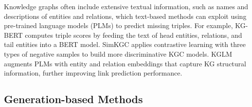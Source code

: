 \documentclass[11pt]{article}
\begin{document}
Knowledge graphs often include extensive textual information, such as names and descriptions of entities and relations, which text-based methods can exploit using pre-trained language models (PLMs) to predict missing triples. For example, KG-BERT \citep{yao2019kg} computes triple scores by feeding the text of head entities, relations, and tail entities into a BERT model. SimKGC \citep{wang2022simkgc} applies contrastive learning with three types of negative samples to build more discriminative KGC models. KGLM \citep{youn2022kglm} augments PLMs with entity and relation embeddings that capture KG structural information, further improving link prediction performance.

\subsection{Generation-based Methods}

\end{document}
